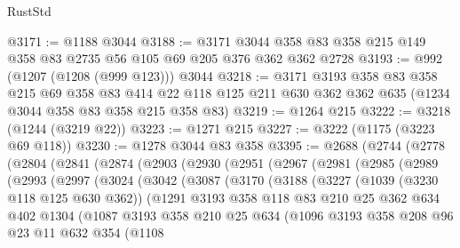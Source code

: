 \begin{lexlean}{RustStd}
\begin{coremodule}
@3171 := @1188 @3044
@3188 := @3171 @3044 @358 @83 @358 @215 @149 @358 @83 @2735 @56 @105 @69 @205 @376 @362 @362 @2728
@3193 := @992 (@1207 (@1208 (@999 @123))) @3044
@3218 := @3171
    @3193
    @358
    @83
    @358
    @215
    @69
    @358
    @83
    @414
    @22
    @118
    @125
    @211
    @630
    @362
    @362
    @635
    (@1234 @3044 @358 @83 @358 @215 @358 @83)
@3219 := @1264 @215
@3222 := @3218 (@1244 (@3219 @22))
@3223 := @1271 @215
@3227 := @3222 (@1175 (@3223 @69 @118))
@3230 := @1278 @3044 @83 @358
@3395 := @2688
    (@2744
      (@2778
        (@2804
          (@2841
            (@2874
              (@2903
                (@2930
                  (@2951
                    (@2967
                      (@2981
                        (@2985
                          (@2989
                            (@2993
                              (@2997
                                (@3024
                                  (@3042
                                    (@3087
                                      (@3170
                                        (@3188
                                          (@3227
                                            (@1039 (@3230 @118 @125 @630 @362))
                                            (@1291
                                              @3193
                                              @358
                                              @118
                                              @83
                                              @210
                                              @25
                                              @362
                                              @634
                                              @402
                                              @1304
                                              (@1087
                                                @3193
                                                @358
                                                @210
                                                @25
                                                @634
                                                (@1096
                                                  @3193
                                                  @358
                                                  @208
                                                  @96
                                                  @23
                                                  @11
                                                  @632
                                                  @354
                                                  (@1108

\end{coremodule}
\end{lexlean}
